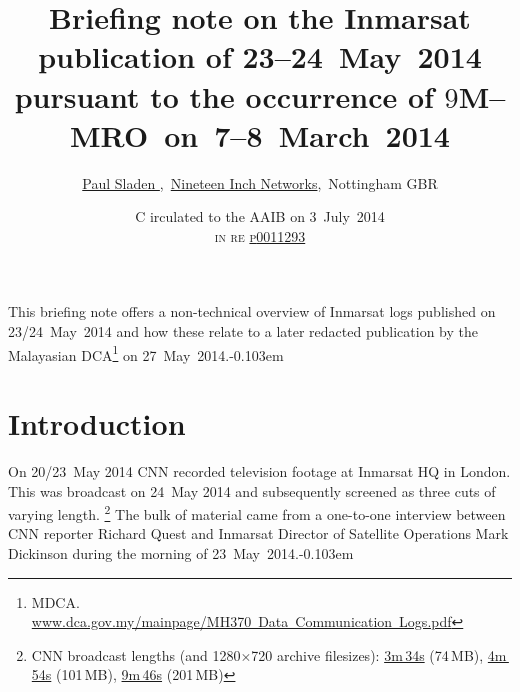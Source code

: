 \documentclass[tikz,a4paper,12pt]{article}
\begin{document}
\author{\href{http://www.paul.sladen.org/}{Paul Sladen%
},\, \href{http://www.19inch.net/}{Nineteen Inch Networks},\, Nottingham GBR
}
\title{%
Briefing note on the Inmarsat publication of 23--24~May~2014
pursuant to the occurrence of
$9$M--\EndAccSupp{}MRO~on~7--8~March~2014%
}
\date{
C%
irculated to the \acrlong{AAIB}
on
3~July~2014\\\textsc{in re} \href{https://www.whatdotheyknow.com/request/9m_mro75008f_aes_exchange_iq_sni}{\textsc{p\hspace{0.09em}}\EndAccSupp{}0011293}}
\maketitle
\vspace{-0.7em}

{This briefing note offers a non-technical overview of Inmarsat logs
published on 23/24~May~2014 and how these relate to a later
redacted publication by the Malayasian DCA\footnote{\acrlong{MDCA}.\,\href{http://www.dca.gov.my/mainpage/MH370\%20Data\%20Communication\%20Logs.pdf}{www.dca.gov.my/mainpage/MH370~Data~Communication~Logs.pdf}} on 27~May~2014.\unskip\parfillskip-0.103em \par}
\vspace{-1.5em}
\section{Introduction}
\vspace{-0.70em}
{On 20/23~May 2014 CNN recorded television footage at Inmarsat HQ in
London.  This was broadcast on 24~May 2014 and subsequently screened
as three cuts of varying length.%
\footnote{CNN broadcast lengths (and 1280$\times$720 archive filesizes):\hspace{0.4em}
\href{http://cnn-f.akamaihd.net/cnn/big/world/2014/05/27/intv-quest-inmarsat-data-dickinson.cnn_27014108_,512x288_55,640x360_90,768x432_130,896x504_185,1280x720_350,0k.mp4.csmil/bitrate=4}
{3m\,34s} (74\,\textsc{MB}),\hspace{0.4em}
\href{http://cnn-f.akamaihd.net/cnn/big/world/2014/05/27/pkg-quest-inmarsat-data.cnn_27020448_,512x288_55,640x360_90,768x432_130,896x504_185,1280x720_350,0k.mp4.csmil/bitrate=4}
{4m\,54s} (101\,\textsc{MB}),\hspace{0.4em}
\href{http://cnn-f.akamaihd.net/cnn/big/world/2014/05/27/intv-quest-uk-inmarsat-dickinson-long.cnn_27080346_,512x288_55,640x360_90,768x432_130,896x504_185,1280x720_350,0k.mp4.csmil/bitrate=4}
{9m\,46s} (201\,MB)}
The bulk of material came from a one-to-one interview between CNN
reporter Richard Quest and Inmarsat Director of Satellite Operations
Mark Dickinson during the morning of
23~May~2014.\unskip\parfillskip-0.103em \par}
\end{document}
